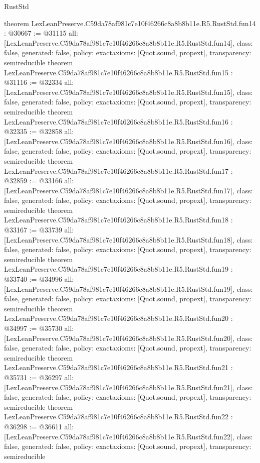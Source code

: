 \begin{lexlean}{RustStd}
\begin{coremodule}
{}
theorem LexLeanPreserve.C59da78af981c7e10f46266c8a8b8b11e.R5.RustStd.fun14 : @30667 := @31115 {
  all: [LexLeanPreserve.C59da78af981c7e10f46266c8a8b8b11e.R5.RustStd.fun14],
  class: false,
  generated: false,
  policy: exact{axioms: [Quot.sound, propext]},
  transparency: semireducible
}
theorem LexLeanPreserve.C59da78af981c7e10f46266c8a8b8b11e.R5.RustStd.fun15 : @31116 := @32334 {
  all: [LexLeanPreserve.C59da78af981c7e10f46266c8a8b8b11e.R5.RustStd.fun15],
  class: false,
  generated: false,
  policy: exact{axioms: [Quot.sound, propext]},
  transparency: semireducible
}
theorem LexLeanPreserve.C59da78af981c7e10f46266c8a8b8b11e.R5.RustStd.fun16 : @32335 := @32858 {
  all: [LexLeanPreserve.C59da78af981c7e10f46266c8a8b8b11e.R5.RustStd.fun16],
  class: false,
  generated: false,
  policy: exact{axioms: [Quot.sound, propext]},
  transparency: semireducible
}
theorem LexLeanPreserve.C59da78af981c7e10f46266c8a8b8b11e.R5.RustStd.fun17 : @32859 := @33166 {
  all: [LexLeanPreserve.C59da78af981c7e10f46266c8a8b8b11e.R5.RustStd.fun17],
  class: false,
  generated: false,
  policy: exact{axioms: [Quot.sound, propext]},
  transparency: semireducible
}
theorem LexLeanPreserve.C59da78af981c7e10f46266c8a8b8b11e.R5.RustStd.fun18 : @33167 := @33739 {
  all: [LexLeanPreserve.C59da78af981c7e10f46266c8a8b8b11e.R5.RustStd.fun18],
  class: false,
  generated: false,
  policy: exact{axioms: [Quot.sound, propext]},
  transparency: semireducible
}
theorem LexLeanPreserve.C59da78af981c7e10f46266c8a8b8b11e.R5.RustStd.fun19 : @33740 := @34996 {
  all: [LexLeanPreserve.C59da78af981c7e10f46266c8a8b8b11e.R5.RustStd.fun19],
  class: false,
  generated: false,
  policy: exact{axioms: [Quot.sound, propext]},
  transparency: semireducible
}
theorem LexLeanPreserve.C59da78af981c7e10f46266c8a8b8b11e.R5.RustStd.fun20 : @34997 := @35730 {
  all: [LexLeanPreserve.C59da78af981c7e10f46266c8a8b8b11e.R5.RustStd.fun20],
  class: false,
  generated: false,
  policy: exact{axioms: [Quot.sound, propext]},
  transparency: semireducible
}
theorem LexLeanPreserve.C59da78af981c7e10f46266c8a8b8b11e.R5.RustStd.fun21 : @35731 := @36297 {
  all: [LexLeanPreserve.C59da78af981c7e10f46266c8a8b8b11e.R5.RustStd.fun21],
  class: false,
  generated: false,
  policy: exact{axioms: [Quot.sound, propext]},
  transparency: semireducible
}
theorem LexLeanPreserve.C59da78af981c7e10f46266c8a8b8b11e.R5.RustStd.fun22 : @36298 := @36611 {
  all: [LexLeanPreserve.C59da78af981c7e10f46266c8a8b8b11e.R5.RustStd.fun22],
  class: false,
  generated: false,
  policy: exact{axioms: [Quot.sound, propext]},
  transparency: semireducible
}
\end{coremodule}
\end{lexlean}
